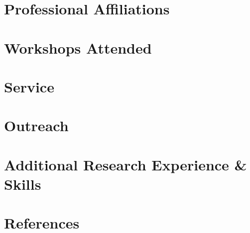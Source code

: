 \section*{Professional Affiliations}


\section*{Workshops Attended}


\section*{Service}


\section*{Outreach}


\section*{Additional Research Experience \& Skills}


\section*{References}
{\raggedright

}


